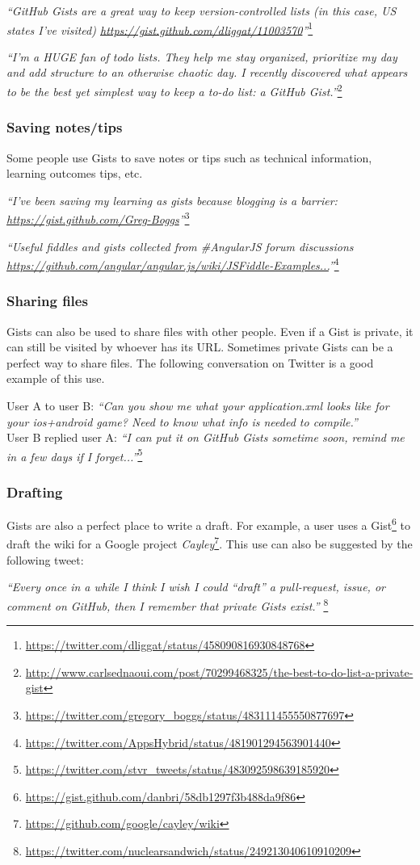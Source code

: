 \textsl{``GitHub Gists are a great way to keep version-controlled lists (in this case, US states I've visited) \url{https://gist.github.com/dliggat/11003570}''}\footnote{\url{https://twitter.com/dliggat/status/458090816930848768}}

\textsl{``I’m a HUGE fan of todo lists. They help me stay organized, prioritize my day and add structure to an otherwise chaotic day. I recently discovered what appears to be the best yet simplest way to keep a to-do list: a GitHub Gist.''}\footnote{\url{http://www.carlsednaoui.com/post/70299468325/the-best-to-do-list-a-private-gist}}

\subsubsection{Saving notes/tips}

Some people use Gists to save notes or tips such as technical information, learning outcomes tips, etc. 

\textsl{``I've been saving my learning as gists because blogging is a barrier: \url{https://gist.github.com/Greg-Boggs}''}\footnote{\url{https://twitter.com/gregory_boggs/status/483111455550877697}}

\textsl{``Useful fiddles and gists collected from \#AngularJS forum discussions \url{https://github.com/angular/angular.js/wiki/JSFiddle-Examples...}''}\footnote{\url{https://twitter.com/AppsHybrid/status/481901294563901440}}

\subsubsection{Sharing files}

Gists can also be used to share files with other people. Even if a Gist is private, it can still be visited by whoever has its URL. Sometimes private Gists can be a perfect way to share files. The following conversation on Twitter is a good example of this use.

\noindent User A to user B: \textsl{``Can you show me what your application.xml looks like for your ios+android game? Need to know what info is needed to compile.''}\\
User B replied user A: \textsl{``I can put it on GitHub Gists sometime soon, remind me in a few days if I forget...''}\footnote{\url{https://twitter.com/stvr_tweets/status/483092598639185920}}

\subsubsection{Drafting}

Gists are also a perfect place to write a draft. For example, a user uses a Gist\footnote{\url{https://gist.github.com/danbri/58db1297f3b488da9f86}} to draft the wiki for a Google project \textit{Cayley}\footnote{\url{https://github.com/google/cayley/wiki}}. This use can also be suggested by the following tweet: 

\textsl{``Every once in a while I think I wish I could ``draft'' a pull-request, issue, or comment on GitHub, then I remember that private Gists exist.''} \footnote{\url{https://twitter.com/nuclearsandwich/status/249213040610910209}}

